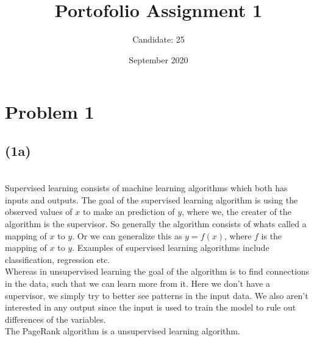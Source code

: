 \documentclass[12pt, letterpaper]{article}
\title{Portofolio Assignment 1}
\author{Candidate: 25}
\date{September 2020}
\begin{document}
  \maketitle
  \section*{Problem 1}
    \subsection*{(1a)} \\
      Supervised learning consists of machine learning algorithms which both has inputs and outputs. The goal of the supervised learning algorithm is using the observed values of $x$ to make an prediction of $y$, where we, the creater of the algorithm is the supervisor. So generally the algorithm consists of whats called a mapping of $x$ to $y$. Or we can generalize this as $y = f(x)$, where $f$ is the mapping of $x$ to $y$. Examples of supervised learning algorithms include classification, regression etc.\\
      \newline
      Whereas in unsupervised learning the goal of the algorithm is to find connections in the data, such that we can learn more from it. Here we don't have a supervisor, we simply try to better see patterns in the input data. We also aren't interested in any output since the input is used to train the model to rule out differences of the variables.\\
      \newline
      The PageRank algorithm is a unsupervised learning algorithm.

      \newline
\end{document}
